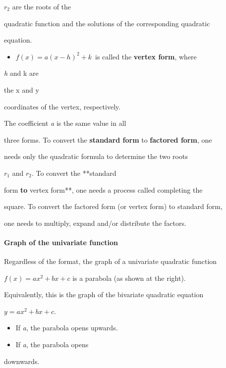     \textit{$r_2$} are the roots of the

    quadratic function and the solutions of the corresponding quadratic

    equation.

\begin{itemize}
    \item $f(x) = a(x - h)^2 + k \,$ is called the \textbf{vertex form}, where
\end{itemize}
    \textit{h} and k are

    the x and y

    coordinates of the vertex, respectively.



The coefficient \textit{a} is the same value in all

three forms. To convert the \textbf{standard form} to \textbf{factored form}, one

needs only the quadratic formula to determine the two roots

\textit{$r_1$} and \textit{$r_2$}. To convert the **standard

form\textbf{ to }vertex form**, one needs a process called completing the

square. To convert the factored form (or vertex form) to standard form,

one needs to multiply, expand and/or distribute the factors.



\paragraph{Graph of the univariate function}



Regardless of the format, the graph of a univariate quadratic function

$f(x) = ax^2 + bx + c$ is a parabola (as shown at the right).

Equivalently, this is the graph of the bivariate quadratic equation

$y = ax^2 + bx + c$.



\begin{itemize}
    \item If \textit{a}, the parabola opens upwards.
    \item If \textit{a}, the parabola opens
\end{itemize}
    downwards.



